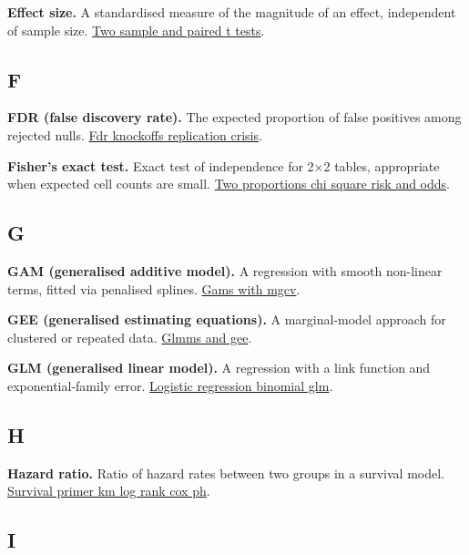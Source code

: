 \documentclass[
]{article}
\begin{document}
\textbf{Effect size.} A standardised measure of the magnitude of an
effect, independent of sample size.
\href{../chapters/04-inferential/labs/lab-two-sample-and-paired-t-tests.Rmd}{Two
sample and paired t tests}.

\subsection{F}\label{f}

\textbf{FDR (false discovery rate).} The expected proportion of false
positives among rejected nulls.
\href{../chapters/13-ml/labs/lab-fdr-knockoffs-replication-crisis.Rmd}{Fdr
knockoffs replication crisis}.

\textbf{Fisher's exact test.} Exact test of independence for 2×2 tables,
appropriate when expected cell counts are small.
\href{../chapters/04-inferential/labs/lab-two-proportions-chi-square-risk-and-odds.Rmd}{Two
proportions chi square risk and odds}.

\subsection{G}\label{g}

\textbf{GAM (generalised additive model).} A regression with smooth
non-linear terms, fitted via penalised splines.
\href{../chapters/07-regression/labs/lab-gams-with-mgcv.Rmd}{Gams with
mgcv}.

\textbf{GEE (generalised estimating equations).} A marginal-model
approach for clustered or repeated data.
\href{../chapters/16-design/labs/lab-glmms-and-gee.Rmd}{Glmms and gee}.

\textbf{GLM (generalised linear model).} A regression with a link
function and exponential-family error.
\href{../chapters/07-regression/labs/lab-logistic-regression-binomial-glm.Rmd}{Logistic
regression binomial glm}.

\subsection{H}\label{h}

\textbf{Hazard ratio.} Ratio of hazard rates between two groups in a
survival model.
\href{../chapters/11-survival/labs/lab-survival-primer-km-log-rank-cox-ph.Rmd}{Survival
primer km log rank cox ph}.

\subsection{I}\label{i}
\end{document}
